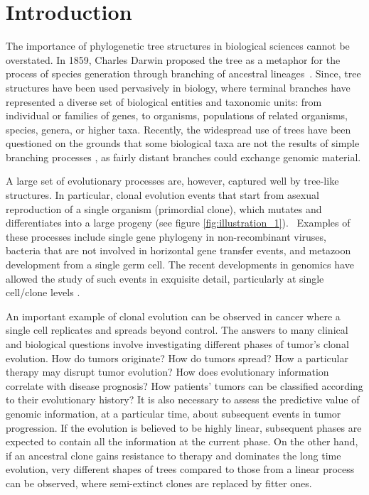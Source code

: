 \documentclass[a4paper,11pt]{article}
\begin{document}

\section{Introduction}

The importance of phylogenetic tree structures in biological sciences cannot be overstated.
In 1859, Charles Darwin proposed the tree as a metaphor for the process of species generation through branching of ancestral lineages~\cite{darwin1859origin}.
Since, tree structures have been used pervasively in biology, where terminal branches have represented a diverse set of biological entities and taxonomic units: from individual or families of genes, to organisms, populations of related organisms, species, genera, or higher taxa.
Recently, the widespread use of trees have been questioned on the grounds that some biological taxa are not the results of simple branching processes \cite{doolittle1999phylogenetic, chan2013topology}, as fairly distant branches could exchange genomic material.

A large set of evolutionary processes are, however, captured well by tree-like structures.
In particular, clonal evolution events that start from asexual reproduction of a single organism (primordial clone), which mutates and differentiates into a large progeny (see figure \ref{fig:illustration_1}).~\cite{khiabanian2014viral}
Examples of these processes include single gene phylogeny in non-recombinant viruses, bacteria that are not involved in horizontal gene transfer events, and metazoon development from a single germ cell.
The recent developments in genomics have allowed the study of such events in exquisite detail, particularly at single cell/clone levels \cite{navin2011tumour, shalek2013single, eirew2014dynamics}.

An important example of clonal evolution can be observed in cancer where a single cell replicates and spreads beyond control.
The answers to many clinical and biological questions involve investigating different phases of tumor's clonal evolution.
How do tumors originate?
How do tumors spread?
How a particular therapy may disrupt tumor evolution?
How does evolutionary information correlate with disease prognosis?
How patients' tumors can be classified according to their evolutionary history?
It is also necessary to assess the predictive value of genomic information, at a particular time, about subsequent events in tumor progression.
If the evolution is believed to be highly linear, subsequent phases are expected to contain all the information at the current phase.
On the other hand, if an ancestral clone gains resistance to therapy and dominates the long time evolution, very different shapes of trees compared to those from a linear process can be observed, where semi-extinct clones are replaced by fitter ones.
\end{document}
